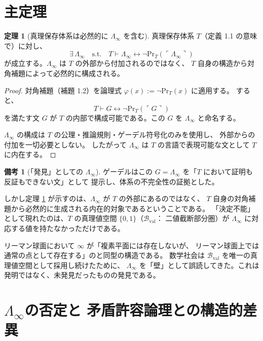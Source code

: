 \documentclass[11pt,a4paper]{ltjsarticle}
\theoremstyle{definition}
\newtheorem{theorem}{定理}[section]
\newtheorem{remark}{備考}[section]
\newcommand{\LawvereInfinity}{\Lambda_\infty}
\newcommand{\Bval}{\mathcal{B}_{\mathrm{val}}}
\renewcommand{\Pr}{\mathrm{Pr}}
\begin{document}
\section{主定理}

\begin{theorem}[真理保存体系は必然的に $\LawvereInfinity$ を含む]
\label{thm:main}
真理保存体系 $T$（定義 1.1 の意味で）に対し、
$$\exists\, \LawvereInfinity \quad \text{s.t.} \quad
T \vdash \LawvereInfinity \leftrightarrow \neg \Pr_T(\ulcorner \LawvereInfinity \urcorner)$$
が成立する。$\LawvereInfinity$ は $T$ の外部から付加されるのではなく、
$T$ 自身の構造から対角補題によって必然的に構成される。
\end{theorem}

\begin{proof}
対角補題（補題 1.2）を論理式 $\varphi(x) := \neg \Pr_T(x)$ に適用する。
すると、
$$T \vdash G \leftrightarrow \neg \Pr_T(\ulcorner G \urcorner)$$
を満たす文 $G$ が $T$ の内部で構成可能である。この $G$ を $\LawvereInfinity$ と命名する。

$\LawvereInfinity$ の構成は $T$ の公理・推論規則・ゲーデル符号化のみを使用し、
外部からの付加を一切必要としない。
したがって $\LawvereInfinity$ は $T$ の言語で表現可能な文として $T$ に内在する。
\end{proof}

\begin{remark}[「発見」としての $\LawvereInfinity$]
ゲーデルはこの $G = \LawvereInfinity$ を「$T$ において証明も反証もできない文」として
提示し、体系の不完全性の証拠とした。

しかし定理 \ref{thm:main} が示すのは、$\LawvereInfinity$ が $T$ の外部にあるのではなく、
$T$ 自身の対角補題から必然的に生成される内在的対象であるということである。
「決定不能」として現れたのは、$T$ の真理値空間 $\{0, 1\}$（$\Bval$：
二値截断部分圏）が $\LawvereInfinity$ に対応する値を持たなかっただけである。

リーマン球面において $\infty$ が「複素平面には存在しないが、
リーマン球面上では通常の点として存在する」のと同型の構造である。
数学社会は $\Bval$ を唯一の真理値空間として採用し続けたために、
$\LawvereInfinity$ を「壁」として誤読してきた。これは発明ではなく、未発見だったものの発見である。
\end{remark}

\section{\texorpdfstring{$\LawvereInfinity$}{Lambda-infinity}の否定と
矛盾許容論理との構造的差異}
\end{document}
